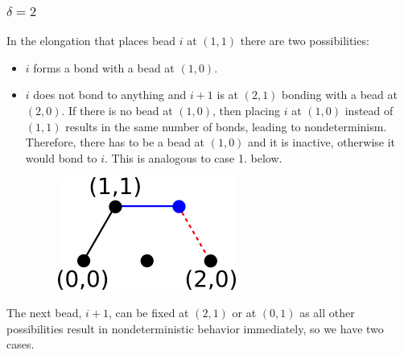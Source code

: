 \subsubsection{$\delta = 2$\\}

In the elongation that places bead $i$ at $(1,1)$ there are two possibilities:
\begin{itemize}
	\item $i$ forms a bond with a bead at $(1,0)$.
	\item  $i$ does not bond to anything and $i+1$ is at $(2,1)$ bonding with a bead at $(2,0)$. If there is no bead at $(1,0)$, then placing $i$ at $(1,0)$ instead of $(1,1)$ results in the same number of bonds, leading to nondeterminism. Therefore, there has to be a bead at $(1,0)$ and it is inactive, otherwise it would bond to $i$. This is analogous to case 1. below.%
	\begin{figure}
		\centering
		\includegraphics[width=0.2\linewidth]{./Fig/hexagonOut1}
		\label{fig:hexagonOut1}
	\end{figure}
	
\end{itemize}
 

The next bead, $i+1$, can be fixed at $(2,1)$ or at $(0,1)$ as all other possibilities result in nondeterministic behavior immediately, so we have two cases.

